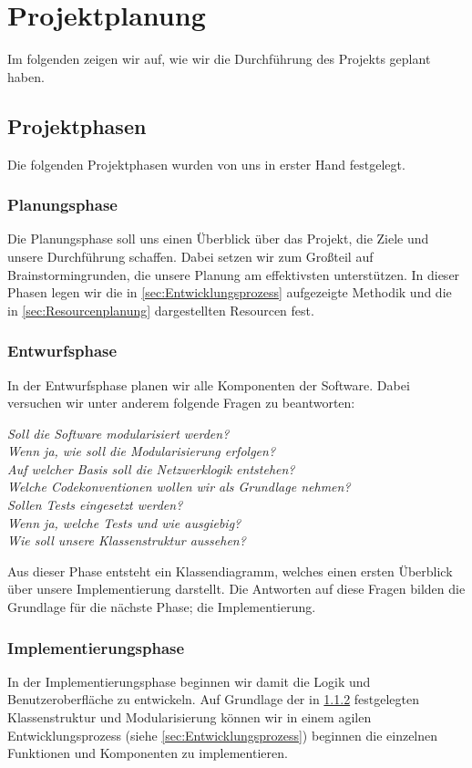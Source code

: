 \section{Projektplanung}
Im folgenden zeigen wir auf, wie wir die Durchführung des Projekts geplant haben.

\subsection{Projektphasen}
Die folgenden Projektphasen wurden von uns in erster Hand festgelegt.

\subsubsection{Planungsphase}
Die Planungsphase soll uns einen Überblick über das Projekt, die Ziele und unsere
Durchführung schaffen. Dabei setzen wir zum Großteil auf Brainstormingrunden, die unsere
Planung am effektivsten unterstützen.
In dieser Phasen legen wir die in \ref{sec:Entwicklungsprozess} aufgezeigte Methodik und die in
\ref{sec:Resourcenplanung} dargestellten Resourcen fest.

\subsubsection{Entwurfsphase}
\label{PhasenEntwurf}
In der Entwurfsphase planen wir alle Komponenten der Software. Dabei versuchen wir unter
anderem folgende Fragen zu beantworten:

\textit{Soll die Software modularisiert werden?\\}
\textit{Wenn ja, wie soll die Modularisierung erfolgen?\\}
\textit{Auf welcher Basis soll die Netzwerklogik entstehen?\\}
\textit{Welche Codekonventionen wollen wir als Grundlage nehmen?\\}
\textit{Sollen Tests eingesetzt werden?\\}
\textit{Wenn ja, welche Tests und wie ausgiebig?\\}
\textit{Wie soll unsere Klassenstruktur aussehen?}

Aus dieser Phase entsteht ein Klassendiagramm, welches einen ersten Überblick über unsere
Implementierung darstellt. Die Antworten auf diese Fragen bilden die Grundlage für die
nächste Phase; die Implementierung.

\subsubsection{Implementierungsphase}
In der Implementierungsphase beginnen wir damit die Logik und Benutzeroberfläche zu
entwickeln. Auf Grundlage der in \ref{PhasenEntwurf} festgelegten Klassenstruktur und
Modularisierung können wir in einem agilen Entwicklungsprozess (siehe
\ref{sec:Entwicklungsprozess}) beginnen die einzelnen Funktionen und Komponenten zu
implementieren.

